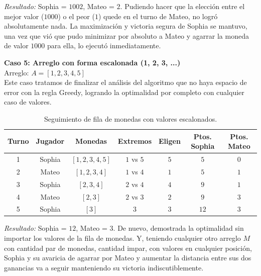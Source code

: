 \textit{Resultado:} Sophia = $1002$, Mateo = $2$. Pudiendo hacer que la elección entre el mejor valor ($1000$) o el peor ($1$) quede en el turno de Mateo, no logró absolutamente nada. La maximización y victoria segura de Sophia se mantuvo, una vez que vió que pudo minimizar por absoluto a Mateo y agarrar la moneda de valor $1000$ para ella, lo ejecutó inmediatamente.

\vspace{6px}
\textbf{Caso 5: Arreglo con forma escalonada (1, 2, 3, ...)}
\\
Arreglo: $A = [1, 2, 3, 4, 5]$
\\
Este caso tratamos de finalizar el análisis del algoritmo que no haya espacio de error con la regla Greedy, logrando la optimalidad por completo con cualquier caso de valores.

\begin{table}[H]
    \centering
    \renewcommand{\arraystretch}{1.2}
    \begin{tabular}{|c|c|c|c|c|c|c|}
    \hline
    \textbf{Turno} & \textbf{Jugador} & \textbf{Monedas} & \textbf{Extremos} & \textbf{Eligen} & \textbf{Ptos. Sophia} & \textbf{Ptos. Mateo} \\ \hline
    1 & Sophia & $[1, 2, 3, 4, 5]$ & $1$ vs $5$ & $5$ & $5$ & $0$ \\ \hline
    2 & Mateo & $[1, 2, 3, 4]$ & $1$ vs $4$ & $1$ & $5$ & $1$ \\ \hline
    3 & Sophia & $[2, 3, 4]$ & $2$ vs $4$ & $4$ & $9$ & $1$ \\ \hline
    4 & Mateo & $[2, 3]$ & $2$ vs $3$ & $2$ & $9$ & $3$ \\ \hline
    5 & Sophia & $[3]$ & $3$ & $3$ & $12$ & $3$ \\ \hline
    \end{tabular}
    \caption{Seguimiento de fila de monedas con valores escalonados.}
    \label{tab:caso5}
\end{table}

\textit{Resultado:} Sophia = $12$, Mateo = $3$. De nuevo, demostrada la optimalidad sin importar los valores de la fila de monedas. Y, teniendo cualquier otro arreglo $M$ con cantidad par de monedas, cantidad impar, con valores en cualquier posición, Sophia y su avaricia de agarrar por Mateo y aumentar la distancia entre sus dos ganancias va a seguir manteniendo su victoria indiscutiblemente.
